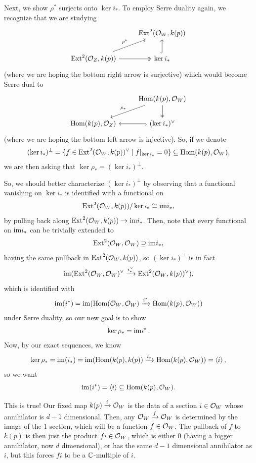 \documentclass[12pt]{article}
\begin{document}
Next, we show $\rho^*$ surjects onto $\ker i_*$. To employ Serre duality again, we recognize that we are studying
\[\begin{tikzcd}
    & \Ext^2(\cO_W,k(p))\\
    \Ext^2(\cO_Z,k(p)) \ar[ur, "\rho^*"] \rar[two heads] & \ker i_* \uar[hook]
\end{tikzcd}\]
(where we are hoping the bottom right arrow is surjective) which would become Serre dual to
\[\begin{tikzcd}
    & \Hom(k(p),\cO_W) \ar[dl, "\rho_*"'] \dar[two heads]\\
    \Hom(k(p),\cO_Z) & \lar[hook] (\ker i_*)^\vee
\end{tikzcd}\]
(where we are hoping the bottom left arrow is injective). So, if we denote
\[(\ker i_*)^\perp = \{f\in \mathrm{Ext}^2(\mathcal{O}_W,k(p))^\vee \mid f|_{\ker i_*} = 0\} \subseteq \mathrm{Hom}(k(p),\mathcal{O}_W),\]
we are then asking that $\ker \rho_* = (\ker i_*)^\perp$.

So, we should better characterize $(\ker i_*)^\perp$ by observing that a functional vanishing on $\ker i_*$ is identified with a functional on
\[\mathrm{Ext}^2(\mathcal{O}_W,k(p))/\ker i_* \cong \mathrm{im} i_*,\]
by pulling back along $\mathrm{Ext}^2(\mathcal{O}_W,k(p)) \to \mathrm{im} i_*$. Then, note that every functional on $\mathrm{im} i_*$ can be trivially extended to
\[\mathrm{Ext}^2(\mathcal{O}_W,\mathcal{O}_W) \supseteq \mathrm{im} i_*,\]
having the same pullback in $\mathrm{Ext}^2(\mathcal{O}_W,k(p))$, so $(\ker i_*)^\perp$ is in fact
\[\mathrm{im}(\mathrm{Ext}^2(\mathcal{O}_W,\mathcal{O}_W)^\vee \xrightarrow{i_*^\vee} \mathrm{Ext}^2(\mathcal{O}_W,k(p))^\vee),\]
which is identified with
\[\mathrm{im}(i^*) = \mathrm{im}(\mathrm{Hom}(\mathcal{O}_W,\mathcal{O}_W) \xrightarrow{i^*} \mathrm{Hom}(k(p),\mathcal{O}_W))\]
under Serre duality, so our new goal is to show
\[\ker \rho_* = \mathrm{im} i^*.\]
Now, by our exact sequences, we know
\[\ker \rho_* = \mathrm{im}(i_*) = \mathrm{im}(\mathrm{Hom}(k(p),k(p)) \xrightarrow{i_*} \mathrm{Hom}(k(p),\mathcal{O}_W)) = \left\langle i\right\rangle,\]
so we want
\[\mathrm{im}(i^*) = \left\langle i\right\rangle \subseteq \mathrm{Hom}(k(p),\mathcal{O}_W).\]

This is true! Our fixed map $k(p) \xrightarrow{i} \mathcal{O}_W$ is the data of a section $i \in \mathcal{O}_W$ whose annihilator is $d-1$ dimensional. Then, any $\mathcal{O}_W \xrightarrow{f} \mathcal{O}_W$ is determined by the image of the 1 section, which will be a function $f\in \mathcal{O}_W$. The pullback of $f$ to $k(p)$ is then just the product $fi \in \mathcal{O}_W$, which is either 0 (having a bigger annihilator, now $d$ dimensional), or has the same $d-1$ dimensional annihilator as $i$, but this forces $f i$ to be a $\mathbb{C}$-multiple of $i$.
\end{document}
